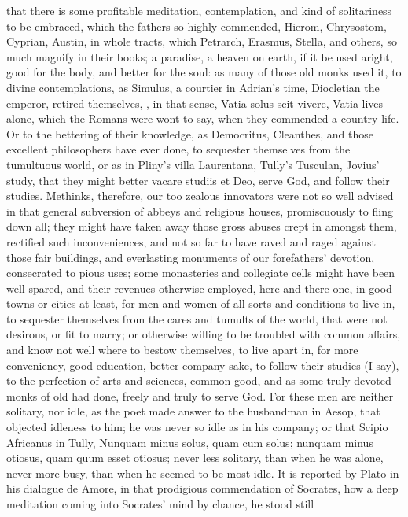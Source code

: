 {that there is some profitable meditation, contemplation, and kind of
solitariness to be embraced, which the fathers so highly commended,
 Hierom, Chrysostom, Cyprian, Austin, in whole tracts, which
Petrarch, Erasmus, Stella, and others, so much magnify in their books;
a paradise, a heaven on earth, if it be used aright, good for the body,
and better for the soul: as many of those old monks used it, to divine
contemplations, as Simulus, a courtier in Adrian's time, Diocletian the
emperor, retired themselves, \etc{}, in that sense, Vatia solus scit
vivere, Vatia lives alone, which the Romans were wont to say, when they
commended a country life. Or to the bettering of their knowledge, as
Democritus, Cleanthes, and those excellent philosophers have ever done,
to sequester themselves from the tumultuous world, or as in Pliny's
villa Laurentana, Tully's Tusculan, Jovius' study, that they might
better vacare studiis et Deo, serve God, and follow their studies.
Methinks, therefore, our too zealous innovators were not so well
advised in that general subversion of abbeys and religious houses,
promiscuously to fling down all; they might have taken away those gross
abuses crept in amongst them, rectified such inconveniences, and not so
far to have raved and raged against those fair buildings, and
everlasting monuments of our forefathers' devotion, consecrated to
pious uses; some monasteries and collegiate cells might have been well
spared, and their revenues otherwise employed, here and there one, in
good towns or cities at least, for men and women of all sorts and
conditions to live in, to sequester themselves from the cares and
tumults of the world, that were not desirous, or fit to marry; or
otherwise willing to be troubled with common affairs, and know not well
where to bestow themselves, to live apart in, for more conveniency,
good education, better company sake, to follow their studies (I say),
to the perfection of arts and sciences, common good, and as some truly
devoted monks of old had done, freely and truly to serve God. For these
men are neither solitary, nor idle, as the poet made answer to the
husbandman in Aesop, that objected idleness to him; he was never so
idle as in his company; or that Scipio Africanus in Tully,
Nunquam minus solus, quam cum solus; nunquam minus otiosus, quam quum
esset otiosus; never less solitary, than when he was alone, never more
busy, than when he seemed to be most idle. It is reported by Plato in
his dialogue de Amore, in that prodigious commendation of Socrates, how
a deep meditation coming into Socrates' mind by chance, he stood still
}
